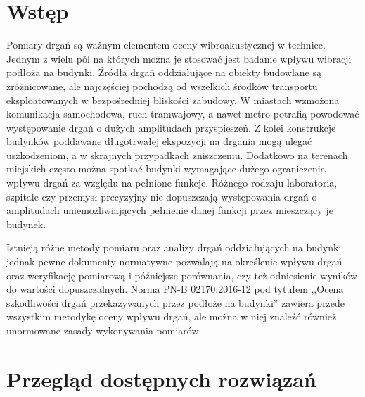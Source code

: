 \documentclass[a4paper,12pt]{mwart}
\begin{document}
\section{Wstęp}

Pomiary drgań są ważnym elementem oceny wibroakustycznej w technice. Jednym
z wielu pól na których można je stosować jest badanie wpływu wibracji
podłoża na budynki. Źródła drgań oddziałujące na obiekty budowlane są
zróżnicowane, ale najczęściej pochodzą od wszelkich środków transportu
eksploatowanych w bezpośredniej bliskości zabudowy. W miastach wzmożona
komunikacja samochodowa, ruch tramwajowy, a nawet metro potrafią powodować
występowanie drgań o dużych amplitudach przyspieszeń. Z kolei konstrukcje
budynków poddawane długotrwałej ekspozycji na drgania mogą ulegać
uszkodzeniom, a w skrajnych przypadkach zniszczeniu. Dodatkowo na terenach
miejskich często można spotkać budynki wymagające dużego ograniczenia wpływu
drgań za względu na pełnione funkcje. Różnego rodzaju laboratoria, szpitale
czy przemysł precyzyjny nie dopuszczają występowania drgań o amplitudach
uniemożliwiających pełnienie danej funkcji przez mieszczący je budynek.

Istnieją różne metody pomiaru oraz analizy drgań oddziałujących na budynki
jednak pewne dokumenty normatywne pozwalają na określenie wpływu drgań oraz
weryfikację pomiarową i późniejsze porównania, czy też odniesienie wyników
do wartości dopuszczalnych. Norma PN-B 02170:2016-12 pod tytułem ,,Ocena
szkodliwości drgań przekazywanych przez podłoże na budynki'' \cite{norma}
zawiera przede wszystkim metodykę oceny wpływu drgań, ale można w niej
znaleźć również unormowane zasady wykonywania pomiarów.

\section{Przegląd dostępnych rozwiązań}
\end{document}
